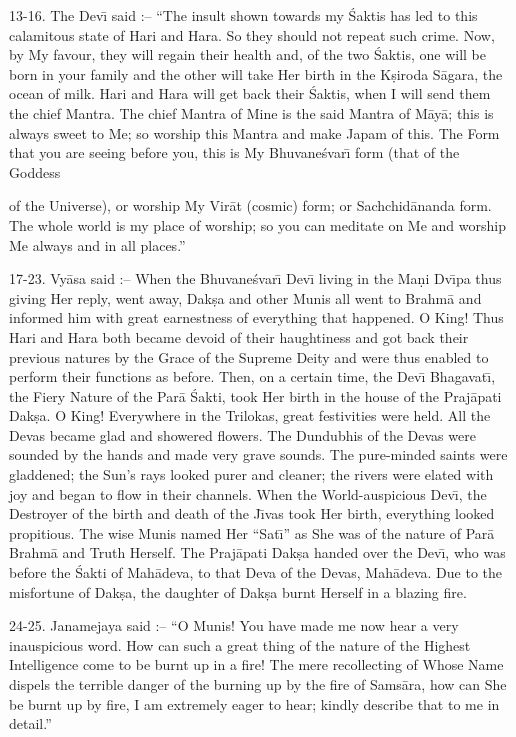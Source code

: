 13-16. The Dev\={\i} said :-- ``The insult shown towards my \'Saktis has led to this calamitous state of Hari and Hara. So they should not repeat such crime. Now, by My favour, they will regain their health and, of the two \'Saktis, one will be born in your family and the other will take Her birth in the K\d{s}iroda S\=agara, the ocean of milk. Hari and Hara will get back their \'Saktis, when I will send them the chief Mantra. The chief Mantra of Mine is the said Mantra of M\=ay\=a; this is always sweet to Me; so worship this Mantra and make Japam of this. The Form that you are seeing before you, this is My Bhuvane\'svar\={\i} form (that of the Goddess

of the Universe), or worship My Vir\=at (cosmic) form; or Sachchid\=ananda form. The whole world is my place of worship; so you can meditate on Me and worship Me always and in all places.''

17-23. Vy\=asa said :-- When the Bhuvane\'svar\={\i} Dev\={\i} living in the Ma\d{n}i Dv\={\i}pa thus giving Her reply, went away, Dak\d{s}a and other Munis all went to Brahm\=a and informed him with great earnestness of everything that happened. O King! Thus Hari and Hara both became devoid of their haughtiness and got back their previous natures by the Grace of the Supreme Deity and were thus enabled to perform their functions as before. Then, on a certain time, the Dev\={\i} Bhagavat\={\i}, the Fiery Nature of the Par\=a \'Sakti, took Her birth in the house of the Praj\=apati Dak\d{s}a. O King! Everywhere in the Trilokas, great festivities were held. All the Devas became glad and showered flowers. The Dundubhis of the Devas were sounded by the hands and made very grave sounds. The pure-minded saints were gladdened; the Sun's rays looked purer and cleaner; the rivers were elated with joy and began to flow in their channels. When the World-auspicious Dev\={\i}, the Destroyer of the birth and death of the J\={\i}vas took Her birth, everything looked propitious. The wise Munis named Her ``Sat\={\i}'' as She was of the nature of Par\=a Brahm\=a and Truth Herself. The Praj\=apati Dak\d{s}a handed over the Dev\={\i}, who was before the \'Sakti of Mah\=adeva, to that Deva of the Devas, Mah\=adeva. Due to the misfortune of Dak\d{s}a, the daughter of Dak\d{s}a burnt Herself in a blazing fire.

24-25. Janamejaya said :-- ``O Munis! You have made me now hear a very inauspicious word. How can such a great thing of the nature of the Highest Intelligence come to be burnt up in a fire! The mere recollecting of Whose Name dispels the terrible danger of the burning up by the fire of Sams\=ara, how can She be burnt up by fire, I am extremely eager to hear; kindly describe that to me in detail.''

